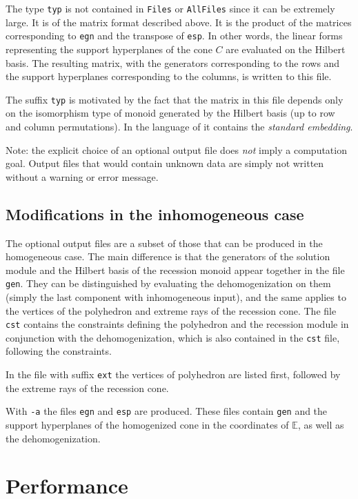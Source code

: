 \documentclass[12pt,a4paper]{scrartcl}
\theoremstyle{definition}
\def\EE{{\mathbb E}}
\def\ttt{\texttt}
\begin{document}
The type \verb|typ| is not contained in \verb|Files| or \verb|AllFiles| since it can be extremely large. It is of the matrix format described above. It is the product of the matrices
corresponding to \ttt{egn} and the transpose of \ttt{esp}. In other
words, the linear forms representing the support
hyperplanes of the cone $C$ are evaluated on the
Hilbert basis. The resulting matrix, with the
generators corresponding to the rows and the support
hyperplanes corresponding to the columns, is written to
this file.

The suffix \ttt{typ} is motivated by the fact that the
matrix in this file depends only on the isomorphism
type of monoid generated by the Hilbert basis (up to
row and column permutations). In the language of
\cite{BG} it contains the \emph{standard embedding}. 

Note: the explicit choice of an optional output file does \emph{not} imply a computation goal. Output files that would contain unknown data are simply not written without a warning or error message.

\subsection{Modifications in the inhomogeneous case}

The optional output files  are a subset of those that can be produced in the homogeneous
case. The main difference is that the generators of the solution module and the
Hilbert basis of the recession monoid appear together in the file \verb|gen|.
They can be distinguished by evaluating the dehomogenization on them (simply the last component with inhomogeneous input), and the
same applies to the  vertices of the polyhedron and extreme rays of the
recession cone. The file \verb|cst| contains the constraints defining the
polyhedron and the recession module in conjunction with the dehomogenization, which is also contained in the \verb|cst| file, following the constraints.

In the file with suffix \verb|ext| the vertices of polyhedron are listed first, followed by the extreme rays of the recession cone.

With \verb|-a| the files \verb|egn| and \verb|esp| are produced. These files contain \verb|gen| and the support hyperplanes of the homogenized cone in the coordinates of $\EE$, as well as the dehomogenization.

\section{Performance}\label{Perf}
\end{document}
